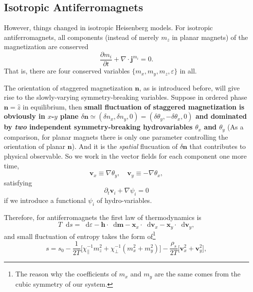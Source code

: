 \documentclass[10pt,nofootinbib,letterpaper]{revtex4}
\newcommand*\dd{\mathop{}\!\mathrm{d}}
\begin{document}
	\subsection{Isotropic Antiferromagnets}
		However, things changed in isotropic Heisenberg models. For isotropic antiferromagnets, all components (instead of merely $m_z$ in planar magnets) of the magnetization are conserved
		\begin{equation}\label{2.5.1}
			\dfrac{\partial m_i}{\partial t}+\nabla\cdot\bm{j}^{m_i}=0.
		\end{equation}
		That is, there are four conserved variables $\{m_x,m_y,m_z,\varepsilon\}$ in all.\par
		The orientation of staggered magnetization $\bm{n}$, as is introduced before, will give rise to the slowly-varying symmetry-breaking variables. Suppose in ordered phase $\bm{n}=\hat{z}$ in equilibrium, then \textbf{small fluctuation of staggered magnetization is obviously in $x$-$y$ plane $\delta\bm{n}\simeq(\delta n_x,\delta n_y,0)=(\delta\theta_y,-\delta\theta_x,0)$ and dominated by \emph{two} independent symmetry-breaking hydrovariables $\theta_x$ and $\theta_y$} (As a comparison, for planar magnets there is only one parameter controlling the orientation of planar $\bm{n}$). And it is the \emph{spatial} flucuation of $\delta\bm{n}$ that contributes to physical observable. So we work in the vector fields for each component one more time,
		\begin{equation*}
			\bm{v}_x\equiv\nabla\theta_y,\quad \bm{v}_y\equiv-\nabla\theta_x,
		\end{equation*}
		satisfying
		\begin{equation}\label{2.5.2}
			\partial_t\bm{v}_i+\nabla\psi_i=0
		\end{equation}
		if we introduce a functional $\psi_i$ of hydro-variables.\par
		Therefore, for antiferromagnets the first law of thermodynamics is
		\begin{equation}\label{2.5.3}
			T\dd s=\dd \varepsilon-\bm{h}\cdot\dd\bm{m}-\bm{x}_x\cdot\dd\bm{v}_x-\bm{x}_y\cdot\dd\bm{v}_y,
		\end{equation}
		and small fluctuation of entropy takes the form of\footnote{The reason why the coefficients of $m_x$ and $m_y$ are the same comes from the cubic symmetry of our system.}
		\begin{equation}\label{2.5.4}
			s=s_0-\dfrac{1}{2T}\bigg[\chi_\parallel^{-1}m_z^2+\chi_\perp^{-1}(m_x^2+m_y^2)\bigg]-\dfrac{\rho_s}{2T}\bigg[\bm{v}_x^2+\bm{v}_y^2\bigg],
		\end{equation}
\end{document}
